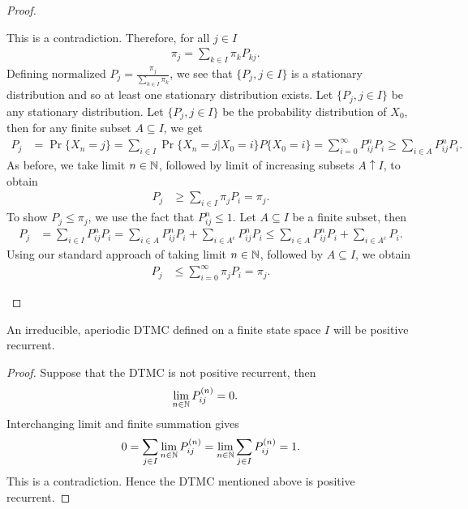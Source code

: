 \documentclass[a4paper,10pt,english]{article}
\begin{document}
\begin{proof}
\begin{enumerate}[i)]
This is a contradiction. Therefore, for all $j \in I$
\begin{align*}
&\pi_j = \sum_{k \in I} \pi_k P_{kj}.
\end{align*}
Defining normalized $P_j = \frac{\pi_j}{\sum_{k \in I}\pi_k}$, 
we see that $\{P_j,j \in I\}$ is a stationary distribution and so at least one stationary distribution exists. 
Let $\{P_j,j \in I\}$ be any stationary distribution. Let $\{P_j,j \in I\}$ be the probability distribution of $X_0$, then for any finite subset $A \subseteq I$, we get 
\begin{align*}
P_j &= \Pr\{X_n = j\} = \sum_{i \in I} \Pr\{X_n = j|X_0 = i\} P\{X_0 = i\} = \sum_{i=0}^{\infty} P_{ij}^nP_i \geq \sum_{i \in A} P_{ij}^nP_i.
\end{align*}
As before, we take limit $n \in \mathbb{N}$, followed by limit of increasing subsets $A \uparrow I$, to obtain
\begin{align*}
P_j &\geq \sum_{i \in I} \pi_j P_i = \pi_j.
\end{align*}
To show $P_j \leq \pi_j$, we use the fact that $P_{ij}^n \leq 1$. Let $A \subseteq I$ be a finite subset, then
\begin{align*}
P_j &= \sum_{i \in I} P_{ij}^nP_i = \sum_{i \in A}P_{ij}^nP_i + \sum_{i \in A^c}P_{ij}^nP_i \leq \sum_{i \in A} P_{ij}^{n}P_i + \sum_{i \in A^c} P_i.
\end{align*}
Using our standard approach of taking limit $n \in \mathbb{N}$, followed by $A \subseteq I$, we obtain
\begin{align*}
P_j &\leq \sum_{i=0}^{\infty} \pi_j P_i = \pi_j.
\end{align*}
\end{enumerate}
\end{proof}

\begin{cor} An irreducible, aperiodic DTMC defined on a finite state space $I$ will be positive recurrent.
\end{cor}
\begin{proof}
Suppose that the DTMC is not positive recurrent, then 
\begin{align*}
\lim_{n \in \mathbb{N}}P_{ij}^{(n)} &= 0.
\end{align*}
Interchanging limit and finite summation gives
\begin{align*}
0 = \sum_{j \in I}\lim_{n \in \mathbb{N}}P_{ij}^{(n)}  = \lim_{n \in \mathbb{N}}\sum_{j \in I}P_{ij}^{(n)} = 1.
\end{align*}
This is a contradiction. 
Hence the DTMC mentioned above is positive recurrent.
\end{proof}
\end{document}
